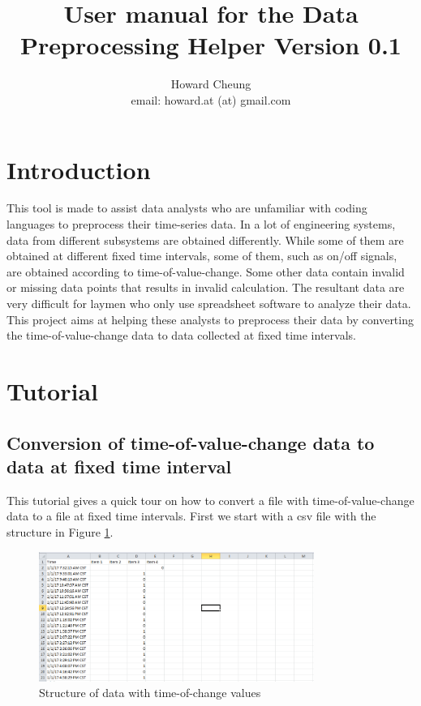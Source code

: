 \documentclass[12pt,a4paper]{article}
\author{Howard Cheung \\ email: howard.at (at) gmail.com }
\title{User manual for the Data Preprocessing Helper Version 0.1}
\begin{document}
\maketitle

\section{Introduction}

This tool is made to assist data analysts who are unfamiliar with coding languages to preprocess their time-series data.
In a lot of engineering systems, data from different subsystems are obtained differently.
While some of them are obtained at different fixed time intervals, some of them, such as on/off signals, are obtained according to time-of-value-change.
Some other data contain invalid or missing data points that results in invalid calculation.
The resultant data are very difficult for laymen who only use spreadsheet software to analyze their data.
This project aims at helping these analysts to preprocess their data by converting the time-of-value-change data to data collected at fixed time intervals.

\section{Tutorial}

\subsection{Conversion of time-of-value-change data to data at fixed time interval}

This tutorial gives a quick tour on how to convert a file with time-of-value-change data to a file at fixed time intervals.
First we start with a csv file with the structure in Figure \ref{fig:ugly_file}.

\begin{figure}[H]
\centering
\includegraphics[width=0.8\textwidth]{time-of-change.png}
\caption{Structure of data with time-of-change values}
\label{fig:ugly_file}
\end{figure}
\end{document}
